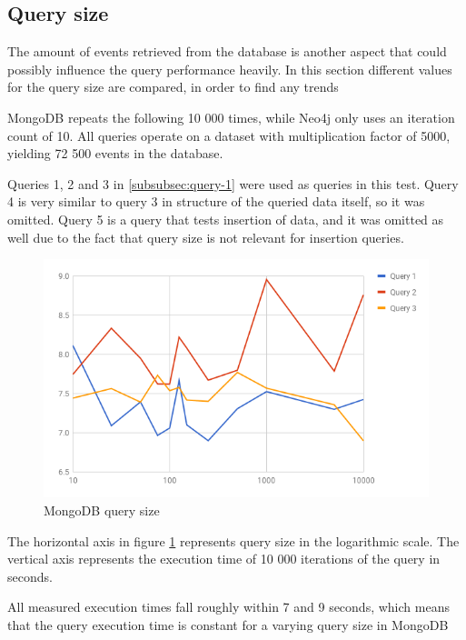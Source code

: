 

\subsection{Query size}
\label{subsec:query-size}

The amount of events retrieved from the database is another aspect that could possibly influence the query performance heavily.
In this section different values for the query size are compared, in order to find any trends

MongoDB repeats the following 10 000 times, while Neo4j only uses an iteration count of 10.
All queries operate on a dataset with multiplication factor of 5000, yielding 72 500 events in the database.

Queries 1, 2 and 3 in \cref{subsubsec:query-1} were used as queries in this test.
Query 4 is very similar to query 3 in structure of the queried data itself, so it was omitted.
Query 5 is a query that tests insertion of data, and it was omitted as well due to the fact that query size is not relevant for insertion queries.

\begin{figure}[H]
  \centering
  \includegraphics[width=.8\textwidth]{img/mongodb-query-size.png}
  \caption{MongoDB query size}
  \label{fig:mongodb-query-size}
\end{figure}

The horizontal axis in figure \ref{fig:mongodb-query-size} represents query size in the logarithmic scale.
The vertical axis represents the execution time of 10 000 iterations of the query in seconds.

All measured execution times fall roughly within 7 and 9 seconds, which means that the query execution time is constant for a varying query size in MongoDB

